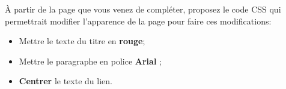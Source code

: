 \documentclass[11pt]{article}
\begin{document}
			
			
			 À partir de la page que vous venez de compléter, proposez le code CSS qui permettrait modifier l’apparence de la page pour faire ces modifications:
			
			\begin{itemize}
				\item Mettre le texte du titre en \textbf{rouge};
				\item Mettre le paragraphe en police \textbf{Arial} ;
				\item \textbf{Centrer} le texte du lien.
			\end{itemize}
			
			
	
\end{document}
